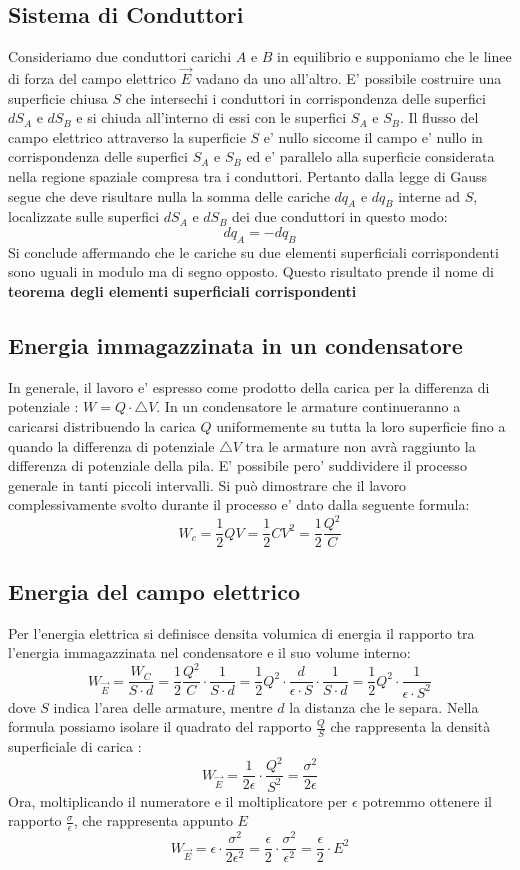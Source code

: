 \documentclass[a4paper, 10pt]{article}
\begin{document}
		\subsection{Sistema di Conduttori}
			Consideriamo due conduttori carichi $A$ e $B$ in equilibrio e supponiamo che le linee di forza del campo
			elettrico $\overrightarrow{E}$ vadano da uno all'altro. E' possibile costruire una superficie chiusa $S$ 
			che intersechi i conduttori in corrispondenza delle superfici $dS_A$ e $dS_B$ e si chiuda all'interno di
			essi con le superfici $S_A$ e $S_B$. Il flusso del campo elettrico attraverso la superficie $S$ e' nullo
			siccome il campo e' nullo in corrispondenza delle superfici $S_A$ e $S_B$ ed e' parallelo alla superficie
			considerata nella regione spaziale compresa tra i conduttori. Pertanto dalla legge di Gauss segue che deve
			risultare nulla la somma delle cariche $dq_A$ e $dq_B$ interne ad $S$, localizzate sulle superfici $dS_A$ e
			$dS_B$ dei due conduttori in questo modo:
			\[ dq_A = -dq_B \]
			Si conclude affermando che le cariche su due elementi superficiali corrispondenti sono
			uguali in modulo ma di segno opposto. 
			Questo risultato prende il nome di \textbf{teorema degli elementi superficiali corrispondenti}
		\subsection{Energia immagazzinata in un condensatore}
			In generale, il lavoro e' espresso come prodotto della carica per la differenza di potenziale
			: $W = Q \cdot \triangle V$. In un condensatore le armature continueranno a caricarsi distribuendo la carica $Q$
			uniformemente su tutta la loro superficie fino a quando la differenza di potenziale $\triangle V$ tra le armature 
			non avrà raggiunto la differenza di potenziale della pila. E' possibile pero' suddividere il processo generale in tanti
			piccoli intervalli. Si può dimostrare che il lavoro complessivamente svolto durante il processo e' dato 
			dalla seguente formula:
			\[ W_c = \frac{1}{2}QV = \frac{1}{2}CV^2 = \frac{1}{2} \frac{Q^2}{C} \]
		\subsection{Energia del campo elettrico}
			Per l'energia elettrica si definisce densita volumica di energia il rapporto tra l'energia immagazzinata nel
			 condensatore e il suo volume interno:
			\[ W_{\overrightarrow{E}} = \frac{W_C}{S \cdot d}  = \frac{1}{2}\frac{Q^2}{C} \cdot \frac{1}{S \cdot d} 
			= \frac{1}{2}Q^2 \cdot \frac{d}{\epsilon \cdot S} \cdot \frac{1}{S \cdot d} = \frac{1}{2}Q^2 \cdot 
			\frac{1}{\epsilon \cdot S^2}\] 
			dove $S$ indica l'area delle armature, mentre $d$ la distanza che le separa. Nella formula possiamo isolare 
			il quadrato del rapporto $\frac{Q}{S}$ che rappresenta la densità superficiale di carica :
			\[ W_{\overrightarrow{E}} = \frac{1}{2\epsilon} \cdot \frac{Q^2}{S^2} = \frac{\sigma^2}{2\epsilon} \]
			Ora, moltiplicando il numeratore e il moltiplicatore per $\epsilon$ potremmo ottenere il rapporto 
			$\frac{\sigma}{\epsilon}$, che rappresenta appunto $E$
			\[ W_{\overrightarrow{E}} = \epsilon \cdot \frac{\sigma^2}{2\epsilon^2} = 
			\frac{\epsilon}{2} \cdot \frac{\sigma^2}{\epsilon^2} = \frac{\epsilon}{2} \cdot E^2 \]
\end{document}
